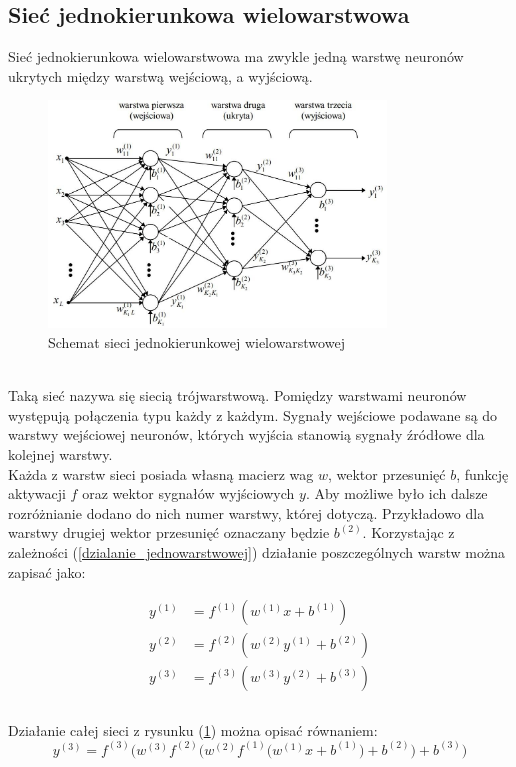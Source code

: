\documentclass[a4paper, openright, twoside,11pt]{article}
\begin{document}
    \subsection{Sieć jednokierunkowa wielowarstwowa}
    Sieć jednokierunkowa wielowarstwowa ma zwykle jedną warstwę neuronów ukrytych między warstwą wejściową, a wyjściową.
    \begin{figure}[h]
        \centering
        \includegraphics[width=0.8\textwidth]{Grafika/schemat_sieci.jpg}
        \caption{Schemat sieci jednokierunkowej wielowarstwowej}
        \label{fig:SchematSieci}
    \end{figure}\\
    Taką sieć nazywa się siecią trójwarstwową. Pomiędzy warstwami neuronów występują połączenia typu każdy z każdym. Sygnały wejściowe podawane są do warstwy wejściowej neuronów, których wyjścia stanowią sygnały źródłowe dla kolejnej warstwy.\\
    Każda z warstw sieci posiada własną macierz wag $w$, wektor przesunięć $b$, funkcję aktywacji $f$ oraz wektor sygnałów wyjściowych $y$. Aby możliwe było ich dalsze rozróżnianie dodano do nich numer warstwy, której dotyczą. Przykładowo dla warstwy drugiej wektor przesunięć oznaczany będzie $b^{(2)}$. Korzystając z zależności (\ref{dzialanie_jednowarstwowej}) działanie poszczególnych warstw można zapisać jako:
    
    \begin{equation}
    \begin{aligned}
    y^{(1)} &= f^{(1)}(w^{(1)}x+b^{(1)})\\
    y^{(2)} &= f^{(2)}(w^{(2)}y^{(1)}+b^{(2)})\\
    y^{(3)} &= f^{(3)}(w^{(3)}y^{(2)}+b^{(3)})\\
    \end{aligned}    
    \end{equation}\\[0.3cm]
    Działanie całej sieci z rysunku (\ref{fig:SchematSieci}) można opisać równaniem:
    \begin{equation}
    y^{(3)} = f^{(3)}\Bigg(w^{(3)}f^{(2)}\bigg(w^{(2)}f^{(1)}\Big(w^{(1)}x+b^{(1)}\Big)+b^{(2)}\bigg)+b^{(3)}\Bigg)
    \end{equation}
    
\end{document}
